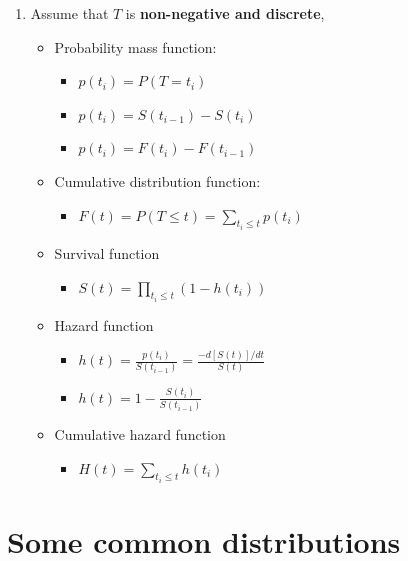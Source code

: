 \documentclass[]{book}
\providecommand{\tightlist}{%
  \setlength{\itemsep}{0pt}\setlength{\parskip}{0pt}}
\theoremstyle{definition}
\theoremstyle{definition}
\theoremstyle{definition}
\theoremstyle{remark}
\begin{document}
\begin{enumerate}
\item
  Assume that \(T\) is \textbf{non-negative and discrete},

  \begin{itemize}
  \tightlist
  \item
    Probability mass function:

    \begin{itemize}
    \tightlist
    \item
      \(p(t_i) = P(T = t_i)\)
    \item
      \(p(t_i) = S(t_{i-1}) - S(t_i)\)
    \item
      \(p(t_i) = F(t_i) - F(t_{i-1})\)
    \end{itemize}
  \item
    Cumulative distribution function:

    \begin{itemize}
    \tightlist
    \item
      \(F(t) = P(T \le t) = \sum_{t_i \le t}{p(t_i)}\)
    \end{itemize}
  \item
    Survival function

    \begin{itemize}
    \tightlist
    \item
      \(S(t) = \prod_{t_i \le t} \left( 1 - h(t_i) \right)\)
    \end{itemize}
  \item
    Hazard function

    \begin{itemize}
    \tightlist
    \item
      \(h(t) = \frac{ p(t_i)}{S(t_{i-1})}= \frac{ -d[S(t)]/dt}{S(t)}\)
    \item
      \(h(t) = 1- \frac{ S(t_i)}{S(t_{i-1})}\)
    \end{itemize}
  \item
    Cumulative hazard function

    \begin{itemize}
    \tightlist
    \item
      \(H(t) = \sum_{t_i \le t} h(t_i)\)
    \end{itemize}
  \end{itemize}
\end{enumerate}

\section{Some common distributions}\label{intro-distri}
\end{document}
